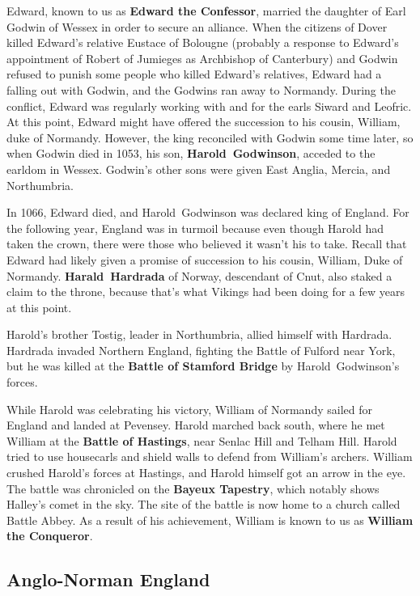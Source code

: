 Edward, known to us as \textbf{Edward the Confessor},
married the daughter of Earl Godwin of Wessex in order to secure an alliance.
When the citizens of Dover killed Edward's relative Eustace of Bolougne
(probably a response to Edward's appointment of Robert of Jumieges as Archbishop of Canterbury)
and Godwin refused to punish some people who killed Edward's relatives,
Edward had a falling out with Godwin, and the Godwins ran away to Normandy.
During the conflict, Edward was regularly working with and for the earls Siward and Leofric.
At this point, Edward might have offered the succession to his cousin, William, duke of Normandy.
However, the king reconciled with Godwin some time later, so when Godwin died in 1053,
his son, \textbf{Harold~Godwinson}, acceded to the earldom in Wessex.
Godwin's other sons were given East Anglia, Mercia, and Northumbria.

In 1066, Edward died, and Harold~Godwinson was declared king of England.
For the following year, England was in turmoil because even though Harold had taken the crown,
there were those who believed it wasn't his to take.
Recall that Edward had likely given a promise of succession to his cousin, William, Duke of Normandy.
\textbf{Harald~Hardrada} of Norway, descendant of Cnut, also staked a claim to the throne,
because that's what Vikings had been doing for a few years at this point.

Harold's brother Tostig, leader in Northumbria, allied himself with Hardrada.
Hardrada invaded Northern England, fighting the Battle of Fulford near York,
but he was killed at the \textbf{Battle of Stamford Bridge} by Harold~Godwinson's forces.

While Harold was celebrating his victory, William of Normandy sailed for England and landed at Pevensey.
Harold marched back south, where he met William at the \textbf{Battle of Hastings},
near Senlac Hill and Telham Hill.
Harold tried to use housecarls and shield walls to defend from William's archers.
William crushed Harold's forces at Hastings, and Harold himself got an arrow in the eye.
The battle was chronicled on the \textbf{Bayeux Tapestry}, which notably shows Halley's comet in the sky.
The site of the battle is now home to a church called Battle Abbey.
As a result of his achievement, William is known to us as \textbf{William the Conqueror}.

\subsection*{Anglo-Norman England}

